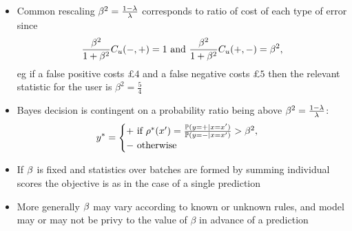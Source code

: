 \documentclass{article}
\begin{document}
\begin{itemize}
        \item
          Common rescaling ${{\beta}}^2=\frac{1-\lambda}\lambda$ corresponds to ratio of cost of each type of error since
          $$
          \frac{\RELCOST^2}{1+\RELCOST^2}\REST[\SCORE][\Usr](-,+)=1\text{ and }\frac{\RELCOST^2}{1+\RELCOST^2}\REST[\SCORE][\Usr](+,-)=\RELCOST^2,
          $$
          eg if a false positive costs £$4$ and a false negative costs £$5$ then the relevant statistic for the user is $\beta^2=\tfrac54$
    \item
      Bayes decision is contingent on a probability ratio being above ${{\beta}}^2=\frac{1-\lambda}\lambda$:
          $$
          \PredB=\begin{cases}+\text{ if }\ProbRatB(\FeatD)=\frac{\mathbb P(\targ=+|\Feat=\FeatD)}{\mathbb P(\targ=-|\Feat=\FeatD)}>\RELCOST^2,\\-\text{ otherwise}\end{cases}
          $$
        \item
          If ${{\beta}}$ is fixed and statistics over batches are formed by summing individual scores the objective is as in the case of a single prediction
        \item
          More generally ${{\beta}}$ may vary according to known or unknown rules, and model may or may not be privy to the value of $\beta$ in advance of a prediction


\end{itemize}
\end{document}
